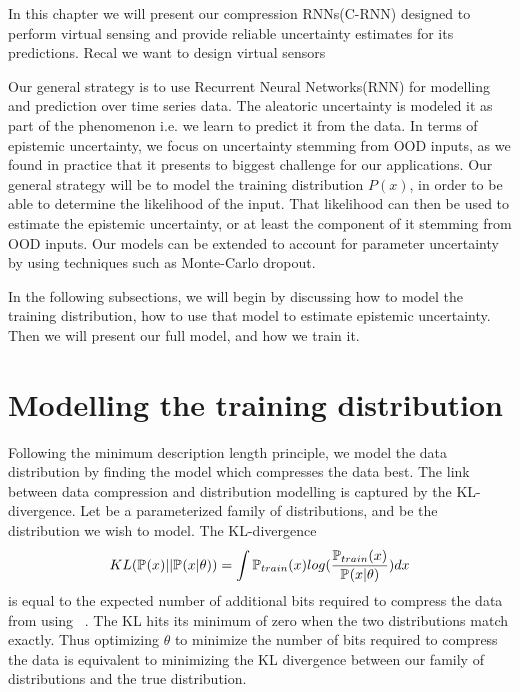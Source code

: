 \documentclass[../main.tex]{subfiles}
\begin{document}
In this chapter we will present our compression RNNs(C-RNN) designed to perform virtual sensing and provide reliable uncertainty estimates for its predictions. Recal we want to design virtual sensors  

Our general strategy is to use Recurrent Neural Networks(RNN) for modelling and prediction over time series data. 
The aleatoric uncertainty is modeled it as part of the phenomenon i.e. we learn to predict it from the data.
In terms of epistemic uncertainty, we focus on uncertainty stemming from OOD inputs, as we found in practice that it presents to biggest challenge for our applications. Our general strategy will be to model the training distribution $P(x)$, in order to be able to determine the likelihood of the input. That likelihood can then be used to estimate the epistemic uncertainty, or at least the component of it stemming from OOD inputs. Our models can be extended to account for parameter uncertainty by using techniques such as Monte-Carlo dropout\citep{gal2016dropout}. 

In the following subsections, we will begin by discussing how to model the training distribution, how to use that model to estimate epistemic uncertainty. Then we will present our full model, and how we train it.

\section{Modelling the training distribution}
\label{sec:information}

Following the minimum description length principle\citep{rissanen1978modeling}, we model the data distribution by finding the model which compresses the data best. The link between data compression and distribution modelling is captured by the KL-divergence. Let  be a parameterized family of distributions, and  be the distribution we wish to model. The KL-divergence
\begin{equation}
    \label{eq:kl}
    KL(\pdf[]{x} || \pdf{x|\theta}) = \int {\pdf[train]{x} log(\frac{\pdf[train]{x}}{\pdf{x|\theta}})} dx
\end{equation}{}
is equal to the expected number of additional bits required to compress the data from  using ~\citep[chapter~5]{mackay2003information}. The KL hits its minimum of zero when the two distributions match exactly. Thus optimizing $\theta$ to minimize the number of bits required to compress the data is equivalent to minimizing the KL divergence between our family of distributions and the true distribution. 
\end{document}
